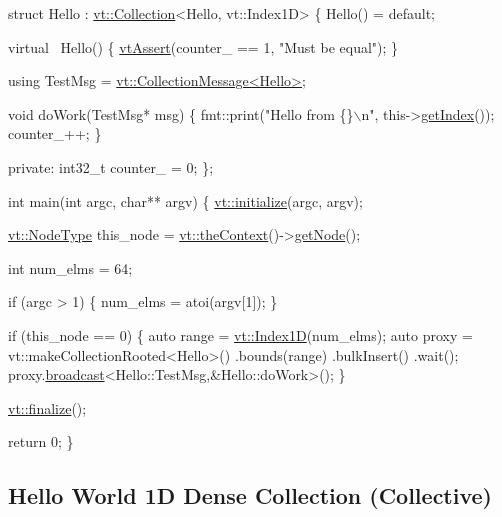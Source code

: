 \begin{DoxyCodeInclude}
\textcolor{keyword}{struct }Hello : \hyperlink{structvt_1_1vrt_1_1collection_1_1_collection}{vt::Collection}<Hello, vt::Index1D> \{
  Hello() = \textcolor{keywordflow}{default};

  \textcolor{keyword}{virtual} ~Hello() \{
    \hyperlink{config__assert_8h_aeddd4990a496e91a0ca5d6c16437359b}{vtAssert}(counter\_ == 1, \textcolor{stringliteral}{"Must be equal"});
  \}

  \textcolor{keyword}{using} TestMsg = \hyperlink{structvt_1_1vrt_1_1collection_1_1_collection_message}{vt::CollectionMessage<Hello>};

  \textcolor{keywordtype}{void} doWork(TestMsg* msg) \{
    fmt::print(\textcolor{stringliteral}{"Hello from \{\}\(\backslash\)n"}, this->\hyperlink{structvt_1_1vrt_1_1collection_1_1_indexable_a28d05f23e7a20e12e94b8235305c1e82}{getIndex}());
    counter\_++;
  \}

\textcolor{keyword}{private}:
  int32\_t counter\_ = 0;
\};

\textcolor{keywordtype}{int} main(\textcolor{keywordtype}{int} argc, \textcolor{keywordtype}{char}** argv) \{
  \hyperlink{namespacevt_aae6ab5af3e11886ce73c4c3ffa008201}{vt::initialize}(argc, argv);

  \hyperlink{namespacevt_a866da9d0efc19c0a1ce79e9e492f47e2}{vt::NodeType} this\_node = \hyperlink{namespacevt_a26551fe0e6e6a1371111df5b12c7e92c}{vt::theContext}()->\hyperlink{structvt_1_1ctx_1_1_context_a0d52c263ce8516546a67443d9a86fa5f}{getNode}();

  \textcolor{keywordtype}{int} num\_elms = 64;

  \textcolor{keywordflow}{if} (argc > 1) \{
    num\_elms = atoi(argv[1]);
  \}

  \textcolor{keywordflow}{if} (this\_node == 0) \{
    \textcolor{keyword}{auto} range = \hyperlink{namespacevt_a5540efc78234273e1796fb003fe4d234}{vt::Index1D}(num\_elms);
    \textcolor{keyword}{auto} proxy = vt::makeCollectionRooted<Hello>()
      .bounds(range)
      .bulkInsert()
      .wait();
    proxy.\hyperlink{structvt_1_1objgroup_1_1proxy_1_1_proxy_a0b716ca776b1f06e0d7d45afbe9e5274}{broadcast}<Hello::TestMsg,&Hello::doWork>();
  \}

  \hyperlink{namespacevt_a540d90dbd6e97b69f1dcbc9ee9314cff}{vt::finalize}();

  \textcolor{keywordflow}{return} 0;
\}
\end{DoxyCodeInclude}
 \hypertarget{collection_collective-hello-world-collection}{}\subsection{Hello World 1\+D Dense Collection (\+Collective)}\label{collection_collective-hello-world-collection}

